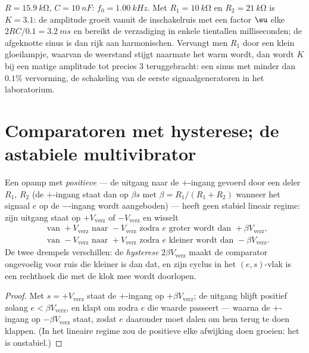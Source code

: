 \begin{example}\label{ex:b2:feedback-oscillators:wiennumbers}
$R = \qty{15.9}{k\ohm}$, $C = \qty{10}{nF}$: $f_0 = \qty{1.00}{kHz}$. Met
$R_1 =
\qty{10}{k\ohm}$ en $R_2 = \qty{21}{k\ohm}$ is $K = 3.1$: de
amplitude groeit vanuit de inschakelruis met een factor $\eu$ elke
$2RC/0.1 = \qty{3.2}{ms}$ en bereikt de verzadiging in enkele tientallen
milliseconden; de afgeknotte sinus is dan rijk aan harmonischen. Vervangt
men $R_1$ door een klein gloeilampje, waarvan de weerstand stijgt naarmate
het warm wordt, dan wordt $K$ bij een matige amplitude tot precies $3$
teruggebracht: een sinus met minder dan $0.1\%$ vervorming, de schakeling
van de eerste signaalgeneratoren in het laboratorium.
\end{example}

\section{Comparatoren met hysterese; de astabiele multivibrator}

\begin{proposition}[Hysteresecomparator]\label{prop:b2:feedback-oscillators:schmitt}
Een opamp met \emph{positieve}  --- de uitgang naar de
$+$-ingang gevoerd door een deler $R_1$, $R_2$ (de $+$-ingang staat dan op
$\beta s$ met $\beta = R_1/(R_1 + R_2)$ wanneer het signaal $e$ op de
$-$-ingang wordt aangeboden) --- heeft geen stabiel lineair regime: zijn
uitgang staat op $+V_{\text{verz}}$ of $-V_{\text{verz}}$ en wisselt
\begin{align*}
&\text{van } +V_{\text{verz}} \text{ naar } -V_{\text{verz}} \text{ zodra } e \text{ groter wordt dan } +\beta V_{\text{verz}} ,\\
&\text{van } -V_{\text{verz}} \text{ naar } +V_{\text{verz}} \text{ zodra } e \text{ kleiner wordt dan } -\beta V_{\text{verz}} .
\end{align*}
De twee drempels verschillen: de \emph{hysterese} $2\beta V_{\text{verz}}$
maakt de comparator ongevoelig voor ruis die kleiner is dan dat, en zijn
cyclus in het $(e, s)$-vlak is een rechthoek die met de klok mee wordt
doorlopen.
\end{proposition}

\begin{proof}
Met $s = +V_{\text{verz}}$ staat de $+$-ingang op $+\beta V_{\text{verz}}$; de
uitgang blijft positief zolang $e < \beta V_{\text{verz}}$, en klapt om zodra
$e$ die waarde passeert --- waarna de $+$-ingang op $-\beta V_{\text{verz}}$
staat, zodat $e$ daaronder moet dalen om hem terug te doen klappen. (In het
lineaire regime zou de positieve  elke afwijking doen groeien:
het is onstabiel.)
\end{proof}

